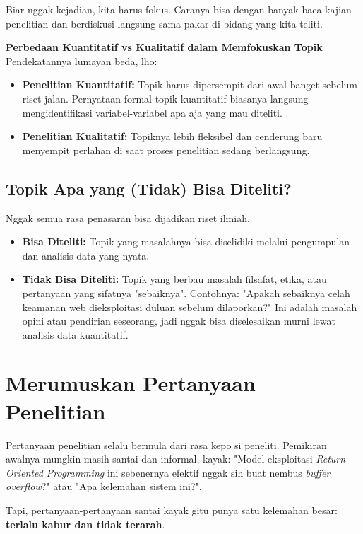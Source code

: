 \documentclass[12pt,a4paper]{article}
\begin{document}
Biar nggak kejadian, kita harus fokus. Caranya bisa dengan banyak baca kajian penelitian dan berdiskusi langsung sama pakar di bidang yang kita teliti. 

\begin{notebox}
\textbf{Perbedaan Kuantitatif vs Kualitatif dalam Memfokuskan Topik}\\
Pendekatannya lumayan beda, lho:
\begin{itemize}
    \item \textbf{Penelitian Kuantitatif:} Topik harus dipersempit dari awal banget sebelum riset jalan. Pernyataan formal topik kuantitatif biasanya langsung mengidentifikasi variabel-variabel apa aja yang mau diteliti.
    \item \textbf{Penelitian Kualitatif:} Topiknya lebih fleksibel dan cenderung baru menyempit perlahan di saat proses penelitian sedang berlangsung.
\end{itemize}
\end{notebox}

\subsection{Topik Apa yang (Tidak) Bisa Diteliti?}
Nggak semua rasa penasaran bisa dijadikan riset ilmiah. 
\begin{itemize}
    \item \textbf{Bisa Diteliti:} Topik yang masalahnya bisa diselidiki melalui pengumpulan dan analisis data yang nyata.
    \item \textbf{Tidak Bisa Diteliti:} Topik yang berbau masalah filsafat, etika, atau pertanyaan yang sifatnya "sebaiknya". Contohnya: "Apakah sebaiknya celah keamanan web dieksploitasi duluan sebelum dilaporkan?" Ini adalah masalah opini atau pendirian seseorang, jadi nggak bisa diselesaikan murni lewat analisis data kuantitatif.
\end{itemize}

\newpage
\section{Merumuskan Pertanyaan Penelitian}

Pertanyaan penelitian selalu bermula dari rasa kepo si peneliti. Pemikiran awalnya mungkin masih santai dan informal, kayak: "Model eksploitasi \textit{Return-Oriented Programming} ini sebenernya efektif nggak sih buat nembus \textit{buffer overflow}?" atau "Apa kelemahan sistem ini?". 

Tapi, pertanyaan-pertanyaan santai kayak gitu punya satu kelemahan besar: \textbf{terlalu kabur dan tidak terarah}. 
\end{document}
